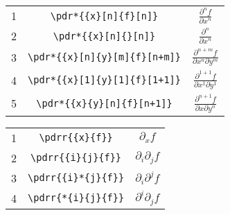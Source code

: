 \documentclass{jsarticle}
\begin{document}
%
\begin{table}[htpt]
\centering
\begin{tabular}{ccc}
1& \verb|\pdr*{{x}[n]{f}[n]}|			& $\displaystyle \frac{\partial^n f}{\partial x^n}$ \\[3mm]
2& \verb|\pdr*{{x}[n]{}[n]}|			& $\displaystyle \frac{\partial^n}{\partial x^n}$ \\[3mm]
3& \verb|\pdr*{{x}[n]{y}[m]{f}[n+m]}|	& $\displaystyle \frac{\partial^{n+m} f}{\partial x^n \partial y^m}$ \\[3mm]
4& \verb|\pdr*{{x}[1]{y}[1]{f}[1+1]}|	& $\displaystyle \frac{\partial^{1+1} f}{\partial x^1 \partial y^1}$ \\[3mm]
5& \verb|\pdr*{{x}{y}[n]{f}[n+1]}|		& $\displaystyle \frac{\partial^{n+1} f}{\partial x \partial y^n}$ \\[3mm]
\end{tabular}
\end{table}
%
\begin{table}[htpt]
\centering
\begin{tabular}{ccc}
1& \verb|\pdrr{{x}{f}}|					& $\displaystyle \partial_{x} f$ \\[3mm]
2& \verb|\pdrr{{i}{j}{f}}|				& $\displaystyle \partial_{i}\partial_{j} f$ \\[3mm]
3& \verb|\pdrr{{i}*{j}{f}}|				& $\displaystyle \partial_{i}\partial^{j} f$ \\[3mm]
4& \verb|\pdrr{*{i}{j}{f}}|				& $\displaystyle \partial^{i}\partial_{j} f$ \\[3mm]
\end{tabular}
\end{table}
\end{document}

